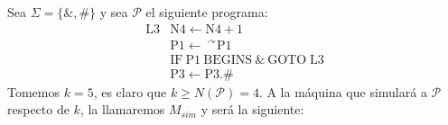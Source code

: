 \begin{frame}
  \begin{example}
    \PN Sea $\Sigma = \{\&,\#\}$ y sea $\mathcal{P}$ el siguiente programa:
    \begin{equation*}
      \begin{array}{ll}
        \mathrm{L}3 & \mathrm{N}4\leftarrow \mathrm{N}4+1 \\
        & \mathrm{P}1\leftarrow \ ^{\curvearrowright }\mathrm{P}1 \\
        & \mathrm{IF\ P}1\ \mathrm{BEGINS\ }\&\ \mathrm{GOTO}\;\mathrm{L}3 \\
        & \mathrm{P}3\leftarrow \mathrm{P}3.\#
      \end{array}
    \end{equation*}
    \PN Tomemos $k=5$, es claro que $k \geq N(\mathcal{P}) = 4$. A la máquina que simulará a $\mathcal{P}$ respecto de
    $k$, la llamaremos $M_{sim}$ y será la siguiente:
\end{example}
\end{frame}
